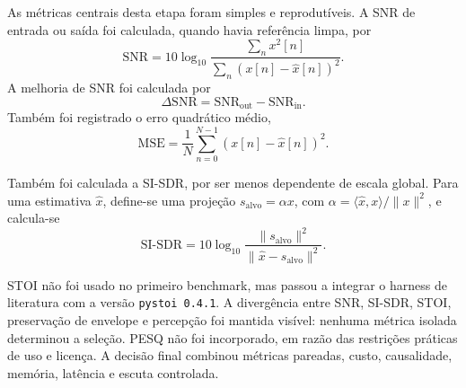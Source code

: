 As métricas centrais desta etapa foram simples e reprodutíveis. A SNR de entrada ou saída foi calculada, quando havia referência limpa, por
\begin{equation}
    \mathrm{SNR} = 10\log_{10}
    \frac{\sum_n x^2[n]}{\sum_n (x[n]-\hat{x}[n])^2}.
\end{equation}
A melhoria de SNR foi calculada por
\begin{equation}
    \Delta\mathrm{SNR} = \mathrm{SNR}_{\mathrm{out}} - \mathrm{SNR}_{\mathrm{in}}.
\end{equation}
Também foi registrado o erro quadrático médio,
\begin{equation}
    \mathrm{MSE} = \frac{1}{N}\sum_{n=0}^{N-1}(x[n]-\hat{x}[n])^2.
\end{equation}

Também foi calculada a SI-SDR, por ser menos dependente de escala global. Para uma estimativa \(\hat{x}\), define-se uma projeção \(s_{\mathrm{alvo}} = \alpha x\), com \(\alpha = \langle \hat{x},x\rangle/\|x\|^2\), e calcula-se
\begin{equation}
    \mathrm{SI\text{-}SDR} =
    10\log_{10}\frac{\|s_{\mathrm{alvo}}\|^2}{\|\hat{x}-s_{\mathrm{alvo}}\|^2}.
\end{equation}

STOI não foi usado no primeiro benchmark, mas passou a integrar o harness de literatura com a versão \texttt{pystoi 0.4.1}. A divergência entre SNR, SI-SDR, STOI, preservação de envelope e percepção foi mantida visível: nenhuma métrica isolada determinou a seleção. PESQ não foi incorporado, em razão das restrições práticas de uso e licença. A decisão final combinou métricas pareadas, custo, causalidade, memória, latência e escuta controlada.

